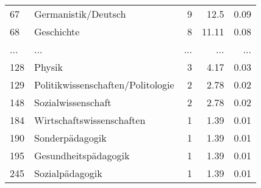 \begin{longtable}{lXrrr}
        67 & \multicolumn{1}{X}{Germanistik/Deutsch} & %
          \num{9} &
          \num[round-mode=places,round-precision=2]{12,5} &
          \num[round-mode=places,round-precision=2]{0,09} \\
        68 & \multicolumn{1}{X}{Geschichte} & %
          \num{8} &
          \num[round-mode=places,round-precision=2]{11,11} &
          \num[round-mode=places,round-precision=2]{0,08} \\
       ... & ... & ... & ... & ... \\
        128 & \multicolumn{1}{X}{Physik} & %
          \num{3} &
          \num[round-mode=places,round-precision=2]{4,17} &
          \num[round-mode=places,round-precision=2]{0,03} \\

        129 & \multicolumn{1}{X}{Politikwissenschaften/Politologie} & %
          \num{2} &
          \num[round-mode=places,round-precision=2]{2,78} &
          \num[round-mode=places,round-precision=2]{0,02} \\

        148 & \multicolumn{1}{X}{Sozialwissenschaft} & %
          \num{2} &
          \num[round-mode=places,round-precision=2]{2,78} &
          \num[round-mode=places,round-precision=2]{0,02} \\

        184 & \multicolumn{1}{X}{Wirtschaftswissenschaften} & %
          \num{1} &
          \num[round-mode=places,round-precision=2]{1,39} &
          \num[round-mode=places,round-precision=2]{0,01} \\

        190 & \multicolumn{1}{X}{Sonderpädagogik} & %
          \num{1} &
          \num[round-mode=places,round-precision=2]{1,39} &
          \num[round-mode=places,round-precision=2]{0,01} \\

        195 & \multicolumn{1}{X}{Gesundheitspädagogik} & %
          \num{1} &
          \num[round-mode=places,round-precision=2]{1,39} &
          \num[round-mode=places,round-precision=2]{0,01} \\

        245 & \multicolumn{1}{X}{Sozialpädagogik} & %
          \num{1} &
          \num[round-mode=places,round-precision=2]{1,39} &
          \num[round-mode=places,round-precision=2]{0,01} \\


\end{longtable}
